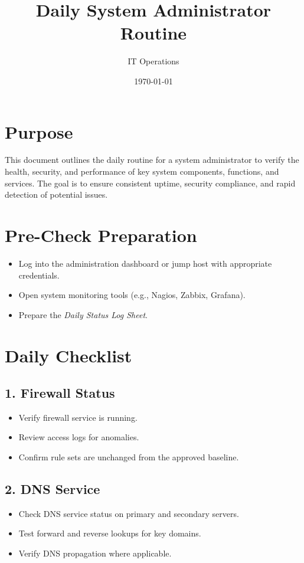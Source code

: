 \documentclass[12pt,a4paper]{article}
\title{Daily System Administrator Routine}
\author{IT Operations}
\date{\today}
\begin{document}
\maketitle

\section*{Purpose}
This document outlines the daily routine for a system administrator to verify the health, security, and performance of key system components, functions, and services. The goal is to ensure consistent uptime, security compliance, and rapid detection of potential issues.

\section{Pre-Check Preparation}
\begin{itemize}[leftmargin=1.5em]
    \item Log into the administration dashboard or jump host with appropriate credentials.
    \item Open system monitoring tools (e.g., Nagios, Zabbix, Grafana).
    \item Prepare the \textit{Daily Status Log Sheet}.
\end{itemize}

\section{Daily Checklist}

\subsection{1. Firewall Status}
\begin{itemize}[leftmargin=1.5em]
    \item Verify firewall service is running.
    \item Review access logs for anomalies.
    \item Confirm rule sets are unchanged from the approved baseline.
\end{itemize}

\subsection{2. DNS Service}
\begin{itemize}[leftmargin=1.5em]
    \item Check DNS service status on primary and secondary servers.
    \item Test forward and reverse lookups for key domains.
    \item Verify DNS propagation where applicable.
\end{itemize}
\end{document}
